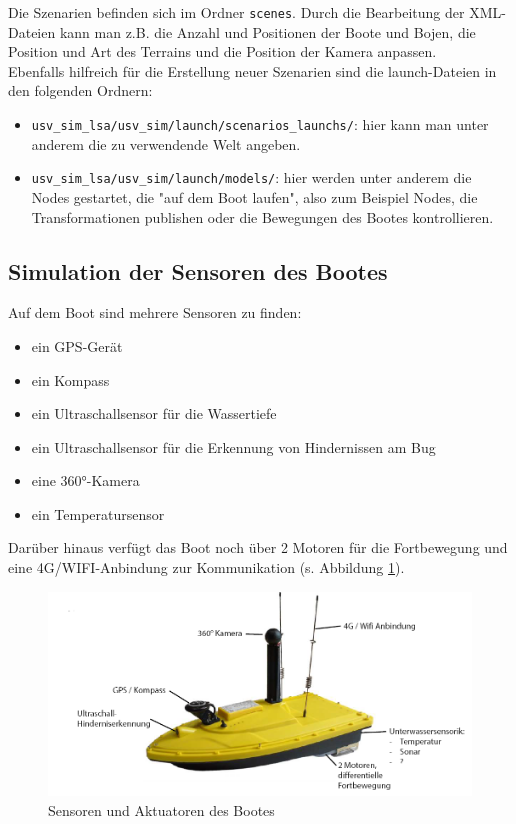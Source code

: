\documentclass[11pt]{article}
\begin{document}
Die Szenarien befinden sich im Ordner \texttt{scenes}. Durch die Bearbeitung der XML-Dateien kann man z.B. die Anzahl und Positionen der Boote und Bojen, die Position und Art des Terrains und die Position der Kamera anpassen.\\
Ebenfalls hilfreich für die Erstellung neuer Szenarien sind die launch-Dateien in den folgenden Ordnern:

\begin{itemize}
	\item \texttt{usv\_sim\_lsa/usv\_sim/launch/scenarios\_launchs/}: hier kann man unter anderem die zu verwendende Welt angeben.
	\item \texttt{usv\_sim\_lsa/usv\_sim/launch/models/}: hier werden unter anderem die Nodes gestartet, die "auf dem Boot laufen", also zum Beispiel Nodes, die Transformationen publishen oder die Bewegungen des Bootes kontrollieren.
\end{itemize}

\subsection{Simulation der Sensoren des Bootes}

Auf dem Boot sind mehrere Sensoren zu finden:

\begin{itemize}
	\item ein GPS-Gerät
	\item ein Kompass
	\item ein Ultraschallsensor für die Wassertiefe
	\item ein Ultraschallsensor für die Erkennung von Hindernissen am Bug
	\item eine 360°-Kamera
	\item ein Temperatursensor
\end{itemize}

Darüber hinaus verfügt das Boot noch über 2 Motoren für die Fortbewegung und eine 4G/WIFI-Anbindung zur Kommunikation (s. Abbildung \ref{boot}).\\

\begin{figure}
    \centering
	\includegraphics[width=0.9\linewidth]{boot.png}
	\caption{Sensoren und Aktuatoren des Bootes}
	\label{boot}
\end{figure}
\end{document}
